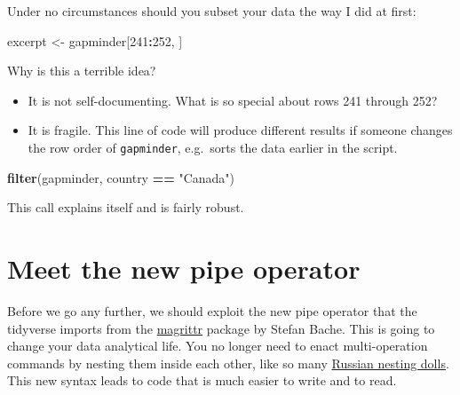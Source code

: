 \documentclass[
]{book}
\newenvironment{Shaded}{\begin{snugshade}}{\end{snugshade}}
\newcommand{\CommentTok}[1]{\textcolor[rgb]{0.56,0.35,0.01}{\textit{#1}}}
\newcommand{\DecValTok}[1]{\textcolor[rgb]{0.00,0.00,0.81}{#1}}
\newcommand{\KeywordTok}[1]{\textcolor[rgb]{0.13,0.29,0.53}{\textbf{#1}}}
\newcommand{\NormalTok}[1]{#1}
\newcommand{\OperatorTok}[1]{\textcolor[rgb]{0.81,0.36,0.00}{\textbf{#1}}}
\newcommand{\StringTok}[1]{\textcolor[rgb]{0.31,0.60,0.02}{#1}}
\providecommand{\tightlist}{%
  \setlength{\itemsep}{0pt}\setlength{\parskip}{0pt}}
\begin{document}
\begin{Shaded}
\end{Shaded}

Under no circumstances should you subset your data the way I did at first:

\begin{Shaded}
\begin{Highlighting}[]
\NormalTok{excerpt <-}\StringTok{ }\NormalTok{gapminder[}\DecValTok{241}\OperatorTok{:}\DecValTok{252}\NormalTok{, ]}
\end{Highlighting}
\end{Shaded}

Why is this a terrible idea?

\begin{itemize}
\tightlist
\item
  It is not self-documenting. What is so special about rows 241 through 252?
\item
  It is fragile. This line of code will produce different results if someone changes the row order of \texttt{gapminder}, e.g.~sorts the data earlier in the script.
\end{itemize}

\begin{Shaded}
\begin{Highlighting}[]
\KeywordTok{filter}\NormalTok{(gapminder, country }\OperatorTok{==}\StringTok{ "Canada"}\NormalTok{)}
\end{Highlighting}
\end{Shaded}

This call explains itself and is fairly robust.

\hypertarget{meet-the-new-pipe-operator}{%
\section{Meet the new pipe operator}\label{meet-the-new-pipe-operator}}

Before we go any further, we should exploit the new pipe operator that the tidyverse imports from the \href{https://magrittr.tidyverse.org}{magrittr} package by Stefan Bache. This is going to change your data analytical life. You no longer need to enact multi-operation commands by nesting them inside each other, like so many \href{https://en.wikipedia.org/wiki/Matryoshka_doll}{Russian nesting dolls}. This new syntax leads to code that is much easier to write and to read.
\end{document}
